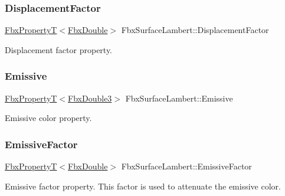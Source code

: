 \subsubsection{\texorpdfstring{Displacement\+Factor}{DisplacementFactor}}
{\footnotesize\ttfamily \hyperlink{class_fbx_property_t}{Fbx\+PropertyT}$<$\hyperlink{fbxtypes_8h_a171e72a1c46fc15c1a6c9c31948c1c5b}{Fbx\+Double}$>$ Fbx\+Surface\+Lambert\+::\+Displacement\+Factor}



Displacement factor property. 

\mbox{\label{class_fbx_surface_lambert_a8ca6383b7fe25ea69039b3340affb793}} 
\subsubsection{\texorpdfstring{Emissive}{Emissive}}
{\footnotesize\ttfamily \hyperlink{class_fbx_property_t}{Fbx\+PropertyT}$<$\hyperlink{fbxtypes_8h_ae0a96f14cde566774c7553aa7523b7a7}{Fbx\+Double3}$>$ Fbx\+Surface\+Lambert\+::\+Emissive}



Emissive color property. 

\mbox{\label{class_fbx_surface_lambert_aad698a7a185c579fdf97131876c474ef}} 
\subsubsection{\texorpdfstring{Emissive\+Factor}{EmissiveFactor}}
{\footnotesize\ttfamily \hyperlink{class_fbx_property_t}{Fbx\+PropertyT}$<$\hyperlink{fbxtypes_8h_a171e72a1c46fc15c1a6c9c31948c1c5b}{Fbx\+Double}$>$ Fbx\+Surface\+Lambert\+::\+Emissive\+Factor}

Emissive factor property. This factor is used to attenuate the emissive color. \mbox{\label{class_fbx_surface_lambert_a2d543c9a3ee42c0443fa7b81ecb54754}} 
